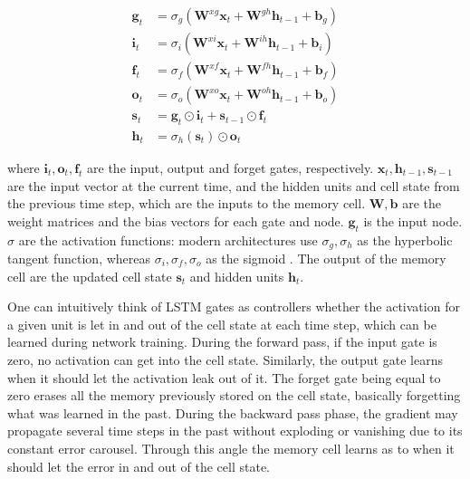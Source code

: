\documentclass{kththesis}
\begin{document}
\begin{equation}
\begin{aligned} 
\mathbf{g}_t &= \sigma_g(\mathbf{W}^{xg}\mathbf{x}_t + \mathbf{W}^{gh}\mathbf{h}_{t-1}+\mathbf{b}_g) \\ 
\mathbf{i}_t &= \sigma_i(\mathbf{W}^{xi}\mathbf{x}_t + \mathbf{W}^{ih}\mathbf{h}_{t-1}+\mathbf{b}_i) \\
\mathbf{f}_t &= \sigma_f(\mathbf{W}^{xf}\mathbf{x}_t + \mathbf{W}^{fh}\mathbf{h}_{t-1}+\mathbf{b}_f) \\
\mathbf{o}_t &= \sigma_o(\mathbf{W}^{xo}\mathbf{x}_t + \mathbf{W}^{oh}\mathbf{h}_{t-1}+\mathbf{b}_o) \\
\mathbf{s}_t &= \mathbf{g}_t \odot \mathbf{i}_t + \mathbf{s}_{t-1} \odot \mathbf{f}_t \\
\mathbf{h}_t &=  \sigma_h(\mathbf{s}_t) \odot \mathbf{o}_t
\end{aligned}
\end{equation}

where $\mathbf{i}_t, \mathbf{o}_t, \mathbf{f}_t$ are the input, output and forget gates, respectively. $\mathbf{x}_t, \mathbf{h}_{t-1}, \mathbf{s}_{t-1}$ are the input vector at the current time, and the hidden units and cell state from the previous time step, which are the inputs to the memory cell. $\mathbf{W}, \mathbf{b}$ are the weight matrices and the bias vectors for each gate and node. $\mathbf{g}_t$ is the input node. $\sigma$ are the activation functions: modern architectures use $\sigma_g,\sigma_h$ as the hyperbolic tangent function, whereas $\sigma_i,\sigma_f,\sigma_o$ as the sigmoid \citep{zaremba2014learning}. The output of the memory cell are the updated cell state $\mathbf{s}_t$ and hidden units $\mathbf{h}_t$.

One can intuitively think of LSTM gates as controllers whether the activation for a given unit is let in and out of the cell state at each time step, which can be learned during network training. During the forward pass, if the input gate is zero, no activation can get into the cell state. Similarly, the output gate learns when it should let the activation leak out of it. The forget gate being equal to zero erases all the memory previously stored on the cell state, basically forgetting what was learned in the past. During the backward pass phase, the gradient may propagate several time steps in the past without exploding or vanishing due to its constant error carousel. Through this angle the memory cell learns as to when it should let the error in and out of the cell state.
\end{document}
